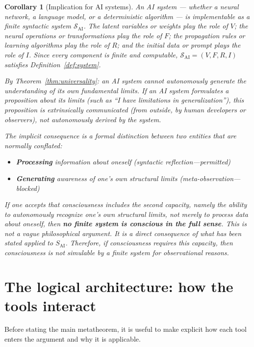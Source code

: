 \documentclass[11pt]{article}
\newtheorem{corollary}[theorem]{Corollary}
\begin{document}
\begin{corollary}[Implication for AI systems]
\label{cor:ai}
An AI system --- whether a neural network, a language model, or a
deterministic algorithm --- is implementable as a finite syntactic system
$\mathcal{S}_{\mathrm{AI}}$. The latent variables or weights play the
role of $V$; the neural operations or transformations play the role of
$F$; the propagation rules or learning algorithms play the role of $R$;
and the initial data or prompt plays the role of $I$. Since every
component is finite and computable,
$\mathcal{S}_{\mathrm{AI}} = (V, F, R, I)$ satisfies
Definition~\ref{def:system}.

By Theorem~\ref{thm:universality}: an AI system cannot autonomously
generate the understanding of its own fundamental limits. If an AI system
formulates a proposition about its limits (such as ``I have limitations
in generalization''), this proposition is extrinsically communicated
(from outside, by human developers or observers), not autonomously
derived by the system.

The implicit consequence is a formal distinction between two entities that are 
normally conflated:

\begin{itemize}
    \item \textbf{Processing} information about oneself (syntactic reflection---permitted)
    \item \textbf{Generating} awareness of one's own structural limits (meta-observation---blocked)
\end{itemize}

If one accepts that consciousness includes the second capacity, namely the ability 
to autonomously recognize one's own structural limits, not merely to process data 
about oneself, then \textbf{no finite system is conscious in the full sense}. This 
is not a vague philosophical argument. It is a direct consequence of what has been 
stated applied to $S_{\mathrm{AI}}$. Therefore, if consciousness requires this 
capacity, then consciousness is not simulable by a finite system for observational 
reasons.

\end{corollary}


\section{The logical architecture: how the tools interact}
\label{sec:architecture}


Before stating the main metatheorem, it is useful to make explicit how
each tool enters the argument and why it is applicable.
\end{document}
